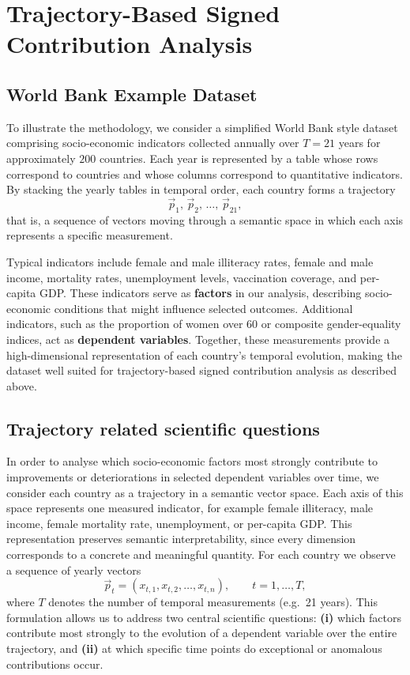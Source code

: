 \section{Trajectory-Based Signed Contribution Analysis}

    \subsection{World Bank Example Dataset}

        To illustrate the methodology, we consider a simplified World Bank style dataset comprising socio-economic indicators collected annually over $T = 21$ years for approximately $200$ countries. Each year is represented by a table whose rows correspond to countries and whose columns correspond to quantitative indicators. By stacking the yearly tables in temporal order, each country forms a trajectory
        \[
            \vec{p}_1,\, \vec{p}_2,\, \ldots,\, \vec{p}_{21},
        \]
        that is, a sequence of vectors moving through a semantic space in which each axis represents a specific measurement.

        Typical indicators include female and male illiteracy rates, female and male income, mortality rates, unemployment levels, vaccination coverage, and per-capita GDP. These indicators serve as \textbf{factors} in our analysis, describing socio-economic conditions that might influence selected outcomes. Additional indicators, such as the proportion of women over 60 or composite gender-equality indices, act as \textbf{dependent variables}. Together, these measurements provide a high-dimensional representation of each country's temporal evolution, making the dataset well suited for trajectory-based signed contribution analysis as described above.

    \subsection{Trajectory related scientific questions}

        In order to analyse which socio-economic factors most strongly contribute to improvements or deteriorations in selected dependent variables over time, we consider each country as a trajectory in a semantic vector space. Each axis of this space represents one measured indicator, for example female illiteracy, male income, female mortality rate, unemployment, or per-capita GDP. This representation preserves semantic interpretability, since every dimension corresponds to a concrete and meaningful quantity. For each country we observe a sequence of yearly vectors
        \[
            \vec{p}_t = (x_{t,1}, x_{t,2}, \ldots, x_{t,n}), \qquad t = 1,\ldots,T,
        \]
        where $T$ denotes the number of temporal measurements (e.g.\ 21 years). This formulation allows us to address two central scientific questions: \textbf{(i)} which factors contribute most strongly to the evolution of a dependent variable over the entire trajectory, and \textbf{(ii)} at which specific time points do exceptional or anomalous contributions occur.

